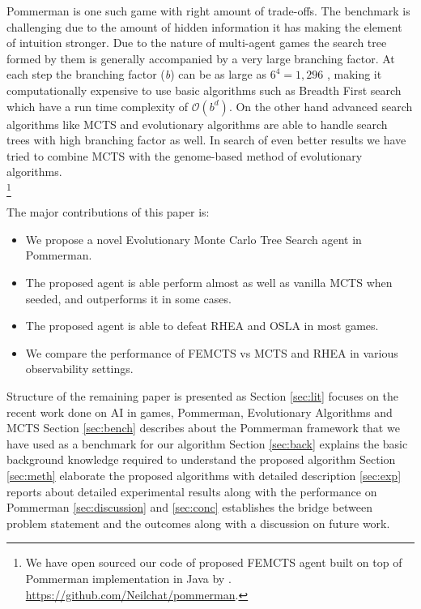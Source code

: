 \documentclass{llncs}
\begin{document}
\noindent
Pommerman \cite{resnick2018pommerman} is one such game with right amount of trade-offs. The benchmark is challenging due to the amount of hidden information it has making the element of intuition stronger. Due to the nature of multi-agent games the search tree formed by them is generally accompanied by a very large branching factor. At each step the branching factor (\emph{b}) can be as large as $6^4 = 1,296$ \cite{osogami2019real} , making it computationally expensive to use basic algorithms such as Breadth First search which have a run time complexity of $\mathcal{O}(b^d)$. On the other hand advanced search algorithms like MCTS and evolutionary algorithms are able to handle search trees with high branching factor as well. In search of even better results we have tried to combine MCTS with the genome-based method of evolutionary algorithms.  \\
\footnote{We have open sourced our code of proposed FEMCTS agent built on top of Pommerman implementation in Java by \cite{perez2019analysis}. \url{https://github.com/Neilchat/pommerman}.}

\noindent
The major contributions of this paper is:\\
\begin{itemize}
    \item We propose a novel Evolutionary Monte Carlo Tree Search agent in Pommerman. 
    \item The proposed agent is able perform almost as well as vanilla MCTS when seeded, and outperforms it in some cases. 
    \item The proposed agent is able to defeat RHEA and OSLA in most games. 
    \item We compare the performance of FEMCTS vs MCTS and RHEA in various observability settings. 
\end{itemize}

\noindent
Structure of the remaining paper is presented as Section \ref{sec:lit} focuses on the recent work done on AI in games, Pommerman, Evolutionary Algorithms and MCTS Section \ref{sec:bench} describes about the Pommerman framework that we have used as a benchmark for our algorithm Section \ref{sec:back} explains the basic background knowledge required to understand the proposed algorithm Section \ref{sec:meth} elaborate the proposed algorithms with detailed description \ref{sec:exp} reports about detailed experimental results along with the performance on Pommerman \ref{sec:discussion} and \ref{sec:conc} establishes the bridge between problem statement and the outcomes along with a discussion on future work. 
\end{document}
